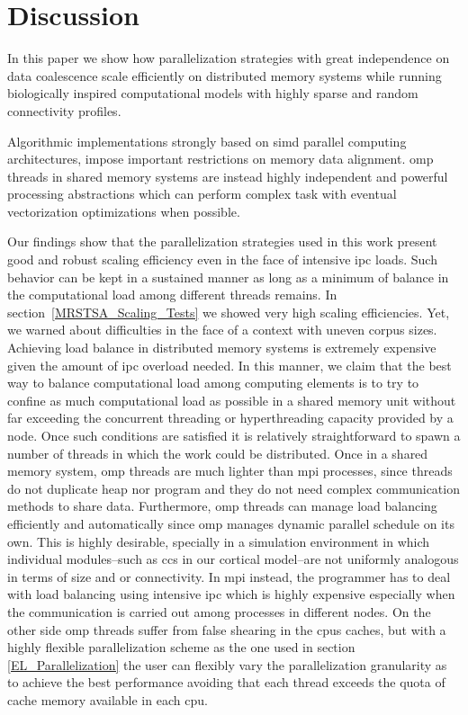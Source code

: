 {\section{Discussion}

In this paper we show how parallelization strategies with great independence on data coalescence scale efficiently on distributed memory systems while running biologically inspired computational models with highly sparse and random connectivity profiles.

Algorithmic implementations strongly based on \gls{simd} parallel computing architectures, impose important restrictions on memory data alignment. \gls{omp} threads in shared memory systems are instead highly independent and powerful processing abstractions which can perform complex task with eventual vectorization optimizations when possible.

Our findings show that the parallelization strategies used in this work present good and robust scaling efficiency even in the face of intensive \gls{ipc} loads. Such behavior can be kept in a sustained manner as long as a minimum of balance in the computational load among different threads remains. In section~\ref{MRSTSA_Scaling_Tests} we showed very high scaling efficiencies. Yet, we warned about difficulties in the face of a context with uneven corpus sizes. Achieving load balance in distributed memory systems is extremely expensive given the amount of \gls{ipc} overload needed. In this manner, we claim that the best way to balance computational load among computing elements is to try to confine as much computational load as possible in a shared memory unit without far exceeding the concurrent threading or hyperthreading capacity provided by a node. Once such conditions are satisfied it is relatively straightforward to spawn a number of threads in which the work could be distributed. Once in a shared memory system, \gls{omp} threads are much lighter than \gls{mpi} processes, since threads do not duplicate heap nor program and they do not need complex communication methods to share data. Furthermore, \gls{omp} threads can manage load balancing efficiently and automatically since \gls{omp} manages dynamic parallel schedule on its own. This is highly desirable, specially in a simulation environment in which individual modules--such as \glspl{cc} in our cortical model--are not uniformly analogous in terms of size and or connectivity. In \gls{mpi} instead, the programmer has to deal with load balancing using intensive \gls{ipc} which is highly expensive especially when the communication is carried out among processes in different nodes. On the other side \gls{omp} threads suffer from false shearing in the \glspl{cpu} caches, but with a highly flexible parallelization scheme as the one used in section \ref{EL_Parallelization} the user can flexibly vary the parallelization granularity as to achieve the best performance avoiding that each thread exceeds the quota of cache memory available in each \gls{cpu}.

}
